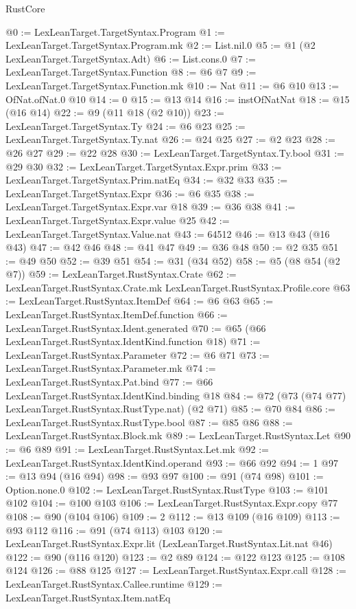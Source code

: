 \begin{lexlean}{RustCore}
\begin{coremodule}
@0 := LexLeanTarget.TargetSyntax.Program
@1 := LexLeanTarget.TargetSyntax.Program.mk
@2 := List.nil.{0}
@5 := @1 (@2 LexLeanTarget.TargetSyntax.Adt)
@6 := List.cons.{0}
@7 := LexLeanTarget.TargetSyntax.Function
@8 := @6 @7
@9 := LexLeanTarget.TargetSyntax.Function.mk
@10 := Nat
@11 := @6 @10
@13 := OfNat.ofNat.{0} @10
@14 := 0
@15 := @13 @14
@16 := instOfNatNat
@18 := @15 (@16 @14)
@22 := @9 (@11 @18 (@2 @10))
@23 := LexLeanTarget.TargetSyntax.Ty
@24 := @6 @23
@25 := LexLeanTarget.TargetSyntax.Ty.nat
@26 := @24 @25
@27 := @2 @23
@28 := @26 @27
@29 := @22 @28
@30 := LexLeanTarget.TargetSyntax.Ty.bool
@31 := @29 @30
@32 := LexLeanTarget.TargetSyntax.Expr.prim
@33 := LexLeanTarget.TargetSyntax.Prim.natEq
@34 := @32 @33
@35 := LexLeanTarget.TargetSyntax.Expr
@36 := @6 @35
@38 := LexLeanTarget.TargetSyntax.Expr.var @18
@39 := @36 @38
@41 := LexLeanTarget.TargetSyntax.Expr.value @25
@42 := LexLeanTarget.TargetSyntax.Value.nat
@43 := 64512
@46 := @13 @43 (@16 @43)
@47 := @42 @46
@48 := @41 @47
@49 := @36 @48
@50 := @2 @35
@51 := @49 @50
@52 := @39 @51
@54 := @31 (@34 @52)
@58 := @5 (@8 @54 (@2 @7))
@59 := LexLeanTarget.RustSyntax.Crate
@62 := LexLeanTarget.RustSyntax.Crate.mk LexLeanTarget.RustSyntax.Profile.core
@63 := LexLeanTarget.RustSyntax.ItemDef
@64 := @6 @63
@65 := LexLeanTarget.RustSyntax.ItemDef.function
@66 := LexLeanTarget.RustSyntax.Ident.generated
@70 := @65 (@66 LexLeanTarget.RustSyntax.IdentKind.function @18)
@71 := LexLeanTarget.RustSyntax.Parameter
@72 := @6 @71
@73 := LexLeanTarget.RustSyntax.Parameter.mk
@74 := LexLeanTarget.RustSyntax.Pat.bind
@77 := @66 LexLeanTarget.RustSyntax.IdentKind.binding @18
@84 := @72 (@73 (@74 @77) LexLeanTarget.RustSyntax.RustType.nat) (@2 @71)
@85 := @70 @84
@86 := LexLeanTarget.RustSyntax.RustType.bool
@87 := @85 @86
@88 := LexLeanTarget.RustSyntax.Block.mk
@89 := LexLeanTarget.RustSyntax.Let
@90 := @6 @89
@91 := LexLeanTarget.RustSyntax.Let.mk
@92 := LexLeanTarget.RustSyntax.IdentKind.operand
@93 := @66 @92
@94 := 1
@97 := @13 @94 (@16 @94)
@98 := @93 @97
@100 := @91 (@74 @98)
@101 := Option.none.{0}
@102 := LexLeanTarget.RustSyntax.RustType
@103 := @101 @102
@104 := @100 @103
@106 := LexLeanTarget.RustSyntax.Expr.copy @77
@108 := @90 (@104 @106)
@109 := 2
@112 := @13 @109 (@16 @109)
@113 := @93 @112
@116 := @91 (@74 @113) @103
@120 := LexLeanTarget.RustSyntax.Expr.lit (LexLeanTarget.RustSyntax.Lit.nat @46)
@122 := @90 (@116 @120)
@123 := @2 @89
@124 := @122 @123
@125 := @108 @124
@126 := @88 @125
@127 := LexLeanTarget.RustSyntax.Expr.call
@128 := LexLeanTarget.RustSyntax.Callee.runtime
@129 := LexLeanTarget.RustSyntax.Item.natEq

\end{coremodule}
\end{lexlean}
